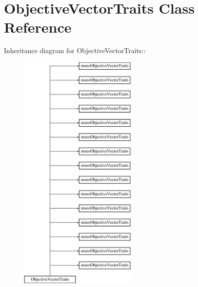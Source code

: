 \section{Objective\-Vector\-Traits Class Reference}
\label{classObjectiveVectorTraits}
Inheritance diagram for Objective\-Vector\-Traits::\begin{figure}[H]
\begin{center}
\leavevmode
\includegraphics[height=12cm]{classObjectiveVectorTraits}
\end{center}
\end{figure}
